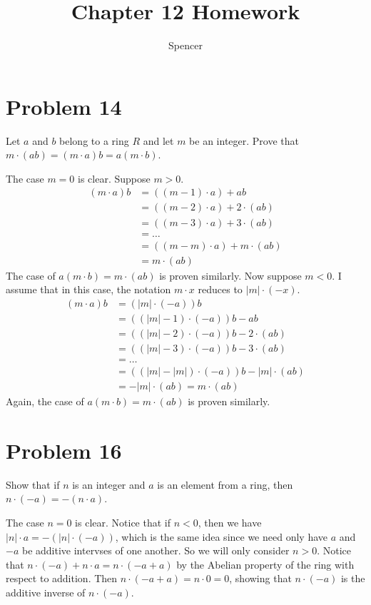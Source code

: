 \documentclass{article}
\title{Chapter 12 Homework}
\author{Spencer}
\begin{document}
\maketitle

\newcommand{\Z}{\mathbb{Z}}
\newcommand{\R}{\mathbb{R}}

\section*{Problem 14}

Let $a$ and $b$ belong to a ring $R$ and let $m$ be an integer.
Prove that $m\cdot(ab)=(m\cdot a)b=a(m\cdot b)$.

The case $m=0$ is clear.  Suppose $m>0$.
\begin{align*}
(m\cdot a)b &= ((m-1)\cdot a) + ab \\
 &= ((m-2)\cdot a) + 2\cdot(ab) \\
 &= ((m-3)\cdot a) + 3\cdot(ab) \\
 &=\dots \\
 &= ((m-m)\cdot a) + m\cdot(ab) \\
 &= m\cdot(ab)
\end{align*}
The case of $a(m\cdot b)=m\cdot(ab)$ is proven similarly.
Now suppose $m<0$.  I assume that in this case, the notation
$m\cdot x$ reduces to $|m|\cdot(-x)$.
\begin{align*}
(m\cdot a)b &= (|m|\cdot(-a))b \\
 &= ((|m|-1)\cdot(-a))b - ab \\
 &= ((|m|-2)\cdot(-a))b - 2\cdot(ab) \\
 &= ((|m|-3)\cdot(-a))b - 3\cdot(ab) \\
 &=\dots \\
 &= ((|m|-|m|)\cdot(-a))b - |m|\cdot(ab) \\
 &= -|m|\cdot(ab) = m\cdot(ab)
\end{align*}
Again, the case of $a(m\cdot b)=m\cdot(ab)$ is proven similarly.

\section*{Problem 16}

Show that if $n$ is an integer and $a$ is an element from a ring, then
$n\cdot(-a)=-(n\cdot a)$.

The case $n=0$ is clear.  Notice that if $n<0$, then
we have $|n|\cdot a=-(|n|\cdot(-a))$, which is the same idea since we
need only have $a$ and $-a$ be additive intervses of one another.
So we will only consider $n>0$.
Notice that $n\cdot(-a)+n\cdot a=n\cdot(-a+a)$ by the Abelian property
of the ring with respect to addition.  Then $n\cdot(-a+a)=n\cdot 0=0$,
showing that $n\cdot(-a)$ is the additive inverse of $n\cdot(-a)$.
\end{document}
